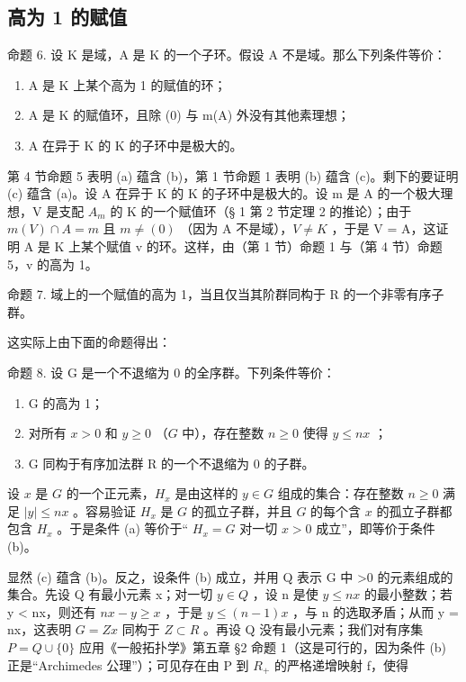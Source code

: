 \subsection{高为 1 的赋值}

命题 6. 设 K 是域，A 是 K 的一个子环。假设 A 不是域。那么下列条件等价：

\begin{enumerate}
\def\labelenumi{(\alph{enumi})}
\item
  A 是 K 上某个高为 1 的赋值的环；
\item
  A 是 K 的赋值环，且除 (0) 与 m(A) 外没有其他素理想；
\item
  A 在异于 K 的 K 的子环中是极大的。
\end{enumerate}

第 4 节命题 5 表明 (a) 蕴含 (b)，第 1 节命题 1 表明 (b) 蕴含 (c)。剩下的要证明 (c) 蕴含 (a)。设 A 在异于 K 的 K 的子环中是极大的。设 m 是 A 的一个极大理想，V 是支配 \(A_{m}\) 的 K 的一个赋值环（§ 1 第 2 节定理 2 的推论）；由于 \(m(V) \cap A = m\) 且 \(m \neq (0)\) （因为 A 不是域），\(V \neq K\) ，于是 V = A，这证明 A 是 K 上某个赋值 v 的环。这样，由（第 1 节）命题 1 与（第 4 节）命题 5，v 的高为 1。

命题 7. 域上的一个赋值的高为 1，当且仅当其阶群同构于 R 的一个非零有序子群。

这实际上由下面的命题得出：

命题 8. 设 G 是一个不退缩为 0 的全序群。下列条件等价：

\begin{enumerate}
\def\labelenumi{(\alph{enumi})}
\item
  G 的高为 1；
\item
  对所有 \(x > 0\) 和 \(y \geqslant 0\) （\(G\) 中），存在整数 \(n \geqslant 0\) 使得 \(y \leqslant nx\) ；
\item
  G 同构于有序加法群 R 的一个不退缩为 0 的子群。
\end{enumerate}

设 \(x\) 是 \(G\) 的一个正元素，\(H_x\) 是由这样的 \(y \in G\) 组成的集合：存在整数 \(n \geqslant 0\) 满足 \(|y| \leqslant nx\) 。容易验证 \(H_x\) 是 \(G\) 的孤立子群，并且 \(G\) 的每个含 \(x\) 的孤立子群都包含 \(H_x\) 。于是条件 (a) 等价于“ \(H_x = G\) 对一切 \(x > 0\) 成立”，即等价于条件 (b)。

显然 (c) 蕴含 (b)。反之，设条件 (b) 成立，并用 Q 表示 G 中 >0 的元素组成的集合。先设 Q 有最小元素 x；对一切 \(y \in Q\) ，设 n 是使 \(y \leqslant nx\) 的最小整数；若 y < nx，则还有 \(nx - y \geqslant x\) ，于是 \(y \leqslant (n - 1)x\) ，与 n 的选取矛盾；从而 y = nx，这表明 \(G = Zx\) 同构于 \(Z \subset R\) 。再设 Q 没有最小元素；我们对有序集 \(P = Q \cup \{0\}\) 应用《一般拓扑学》第五章 §2 命题 1（这是可行的，因为条件 (b) 正是“Archimedes 公理”）；可见存在由 P 到 \(R_{+}\) 的严格递增映射 f，使得

